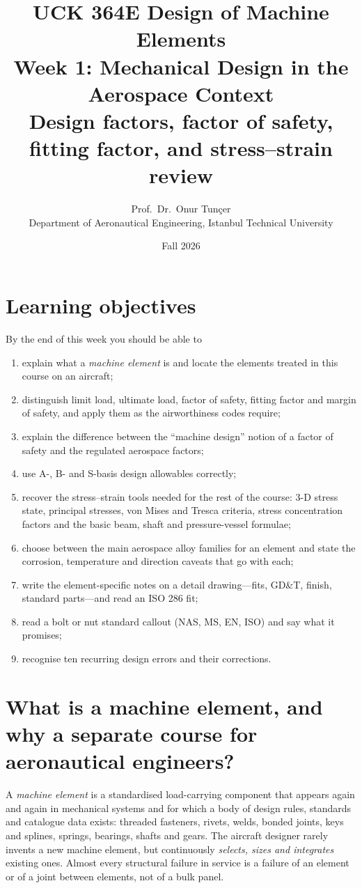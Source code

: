 \documentclass[11pt,a4paper]{article}
\title{\textbf{UCK 364E Design of Machine Elements}\\[4pt]
\Large Week 1: Mechanical Design in the Aerospace Context\\[2pt]
\large Design factors, factor of safety, fitting factor, and stress--strain review}
\author{Prof.\ Dr.\ Onur Tunçer\\ Department of Aeronautical Engineering, Istanbul Technical University}
\date{Fall 2026}
\begin{document}
\maketitle

\section*{Learning objectives}
By the end of this week you should be able to
\begin{enumerate}[nosep]
  \item explain what a \emph{machine element} is and locate the elements treated in this course on an aircraft;
  \item distinguish limit load, ultimate load, factor of safety, fitting factor and margin of safety, and apply them as the airworthiness codes require;
  \item explain the difference between the ``machine design'' notion of a factor of safety and the regulated aerospace factors;
  \item use A-, B- and S-basis design allowables correctly;
  \item recover the stress--strain tools needed for the rest of the course: 3-D stress state, principal stresses, von Mises and Tresca criteria, stress concentration factors and the basic beam, shaft and pressure-vessel formulae;
  \item choose between the main aerospace alloy families for an element and state the corrosion, temperature and direction caveats that go with each;
  \item write the element-specific notes on a detail drawing---fits, GD\&T, finish, standard parts---and read an ISO 286 fit;
  \item read a bolt or nut standard callout (NAS, MS, EN, ISO) and say what it promises;
  \item recognise ten recurring design errors and their corrections.
\end{enumerate}

\section{What is a machine element, and why a separate course for aeronautical engineers?}

A \emph{machine element} is a standardised load-carrying component that appears again and again in mechanical systems and for which a body of design rules, standards and catalogue data exists: threaded fasteners, rivets, welds, bonded joints, keys and splines, springs, bearings, shafts and gears. The aircraft designer rarely invents a new machine element, but continuously \emph{selects, sizes and integrates} existing ones. Almost every structural failure in service is a failure of an element or of a joint between elements, not of a bulk panel.
\end{document}
